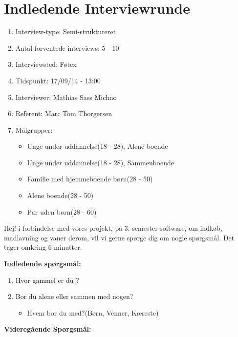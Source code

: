 \chapter{Indledende Interviewrunde}

\begin{enumerate}[topsep=0ex]
	\setlength{\itemsep}{0em}
   \item Interview-type: Semi-struktureret
   \item Antal forventede interviews: 5 - 10
   \item Interviewsted: Føtex
   \item Tidspunkt: 17/09/14 - 13:00
   \item Interviewer: Mathias Sass Michno
   \item Referent: Marc Tom Thorgersen
   \item Målgrupper:
   	\begin{itemize}
   		\item Unge under uddannelse(18 - 28), Alene boende
   		\item Unge under uddannelse(18 - 28), Sammenboende
   		\item Familie med hjemmeboende børn(28 - 50)
	    \item Alene boende(28 - 50)
   		\item Par uden børn(28 - 60)	
   	\end{itemize} 
\end{enumerate}

Hej! i forbindelse med vores projekt, på 3. semester software, om indkøb, madlavning og vaner derom,  vil vi gerne spørge dig om nogle spørgsmål. Det tager omkring 6 minutter.

\textbf{Indledende spørgsmål:}
\begin{enumerate}[topsep=0ex]
	\setlength{\itemsep}{0em}
	\item  Hvor gammel er du ?
	\item  Bor du alene eller sammen med nogen?
	\begin{itemize}
	\item Hvem bor du med?(Børn, Venner, Kæreste)
	\end{itemize} 
\end{enumerate}

\textbf{Videregående Spørgsmål:}
		   
